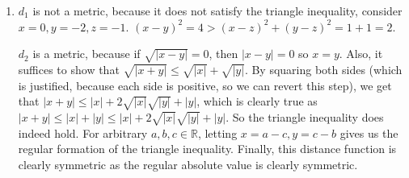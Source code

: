 \documentclass[12pt]{article}
\def\mbb#1{\mathbb{#1}}
\def\bN{\mbb{N}}
\def \R{\mbb{R}}
\theoremstyle{definition}
\theoremstyle{remark}
\begin{document}
\begin{enumerate}[leftmargin=\labelsep]
\begin{enumerate}
			\item 
			Given $x \in \bigcup_{i=1}^\infty \overline{A_i}$, we know that $x \in \overline{A_j}$ for some $j \in \bN$. Then either $x \in A_j$, or $\forall r > 0 (B_r(x) \setminus \set{x}) \cap A_j \neq \emptyset$. If $x \in A_j$, then $x \in \bigcup_{i=1}^\infty A_i$, so certainly $x \in \overline{\bigcup_{i=1}^{\infty} A_i}$. In the second case, since $A_j \subset \bigcup_{i=1}^\infty A_i$, it is also the case that $\forall r > 0 (B_r(x) \setminus \set{x}) \cap \bigcup_{i=1}^{\infty} A_i \neq \emptyset$. But this just says that $x \in \overline{\bigcup_{i=1}^\infty A_i}$ (for $x$ is a limit point of the big union), and as $x$ was arbitrary, this completes the proof.
			
			Let $A_i = [1/i, 1]$ for $i \geq 1$. We see that $B = \bigcup_{i=1}^{\infty} A_i = (0, 1]$.
			\begin{proof}
				$\\$\fbox{$\subseteq$}
				
				Let $x \in \bigcup_{i=1}^{\infty} \qty[\frac1i, 1]$. Then $x \in \qty[\frac1j, 1]$ for some $j \geq 1$, so $0 < \frac1j \leq x \leq 1$, so $x \in (0, 1]$.
				
				\fbox{$\supseteq$}
				
				Let $x \in (0, 1]$. We can find an integer $j \geq 1/x$ by the Archimedian property, so we see that $1/j \leq x$, which means that $x \in [1/j, 1]$ for some $j$.
			\end{proof}
			As the $A_i$'s are already closed, $\bigcup_{i=1}^{\infty} \overline{A_i} = \bigcup_{i=1}^{\infty} A_i = (0, 1]$, while $\overline{B} = [0, 1]$, so the inclusion can indeed be proper.
		\end{enumerate}
	
		\item 
		$d_1$ is not a metric, because it does not satisfy the triangle inequality, consider $x = 0, y = -2, z = -1$. $(x-y)^2 = 4 > (x-z)^2 + (y-z)^2 = 1 + 1 = 2$.
		
		$d_2$ is a metric, because if $\sqrt{|x-y|} = 0$, then $|x-y| = 0$ so $x = y$. Also, it suffices to show that $\sqrt{|x+y|} \leq \sqrt{|x|} + \sqrt{|y|}$. By squaring both sides (which is justified, because each side is positive, so we can revert this step), we get that $|x+y| \leq |x| + 2\sqrt{|x|}\sqrt{|y|} + |y|$, which is clearly true as $|x+y| \leq |x| + |y| \leq  |x| + 2\sqrt{|x|}\sqrt{|y|} + |y|$. So the triangle inequality does indeed hold. For arbitrary $a, b, c \in \R$, letting $x = a-c, y = c-b$ gives us the regular formation of the triangle inequality. Finally, this distance function is clearly symmetric as the regular absolute value is clearly symmetric.
		

\end{enumerate}
\end{document}
